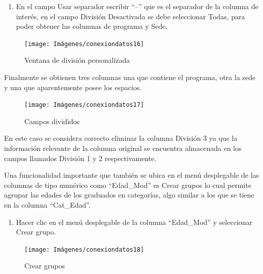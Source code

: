\documentclass[
]{book}
\providecommand{\tightlist}{%
  \setlength{\itemsep}{0pt}\setlength{\parskip}{0pt}}
\begin{document}
\begin{enumerate}
\def\labelenumi{\arabic{enumi}.}
\setcounter{enumi}{1}
\tightlist
\item
  En el campo Usar separador escribir ``--'' que es el separador de la columna de interés, en el campo División Desactivada se debe seleccionar Todas, para poder obtener las columnas de programa y Sede.
\end{enumerate}

\begin{figure}

{\centering \texttt{[image: Imágenes/conexiondatos16]} 

}

\caption{Ventana de división personalizada}\label{fig:divisiónpersonalizadapasos-fig}
\end{figure}

Finalmente se obtienen tres columnas una que contiene el programa, otra la sede y una que aparentemente posee los espacios.

\begin{figure}

{\centering \texttt{[image: Imágenes/conexiondatos17]} 

}

\caption{Campos divididos}\label{fig:camposdivididospersonalizado-fig}
\end{figure}

En este caso se considera correcto eliminar la columna División 3 ya que la información relevante de la columna original se encuentra almacenada en los campos llamados División 1 y 2 respectivamente.

Una funcionalidad importante que también se ubica en el menú desplegable de las columnas de tipo numérico como ``Edad\_Mod'' es Crear grupos lo cual permite agrupar las edades de los graduados en categorías, algo similar a los que se tiene en la columna ``Cat\_Edad''.

\begin{enumerate}
\def\labelenumi{\arabic{enumi}.}
\tightlist
\item
  Hacer clic en el menú desplegable de la columna ``Edad\_Mod'' y seleccionar Crear grupo.
\end{enumerate}

\begin{figure}

{\centering \texttt{[image: Imágenes/conexiondatos18]} 

}

\caption{Crear grupos}\label{fig:creargrupos-fig}
\end{figure}
\end{document}
